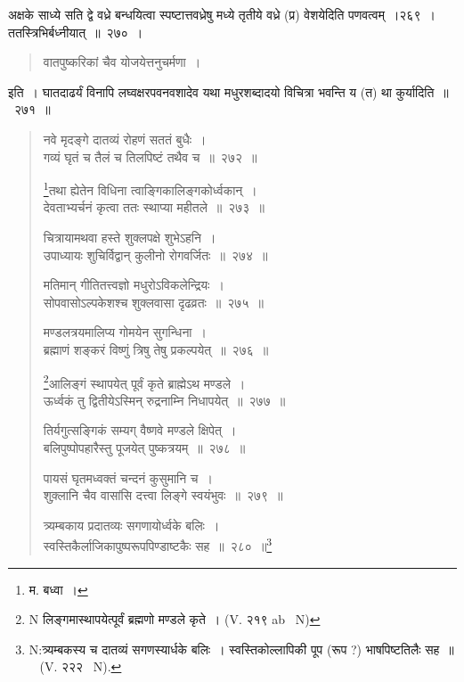 \documentclass[11pt, openany]{book}
\begin{document}
अक्षके साध्ये सति द्वे वध्रे बन्धयित्वा स्पष्टात्तवध्रेषु मध्ये तृतीये वध्रे (प्र) वेशयेदिति पणवत्वम्~।२६९~।\\

ततस्त्रिभिर्बध्नीयात्~॥~२७०~। 

\begin{quote}
{\qt वातपुष्करिकां चैव योजयेत्तनुचर्मणा~।}
\end{quote}

\noindent
इति~। घातदाढर्यं विनापि लघ्वक्षरपवनवशादेव यथा मधुरशब्दादयो विचित्रा भवन्ति य (त) था कुर्यादिति~॥~२७१~॥

\newpage

\begin{quote}
{\na  नवे मृदङ्गे दातव्यं रोहणं सततं बुधैः~।\\
 गव्यं घृतं च तैलं च तिलपिष्टं तथैव च~॥~२७२~॥

 \renewcommand{\thefootnote}{1}\footnote{म. बध्वा~।}तथा ह्येतेन विधिना त्वाङ्गिकालिङ्गकोर्ध्वकान्~।\\
 देवताभ्यर्चनं कृत्वा ततः स्थाप्या महीतले~॥~२७३~॥

 चित्रायामथवा हस्ते शुक्लपक्षे शुभेऽहनि~।\\
 उपाध्यायः शुचिर्विद्वान् कुलीनो रोगवर्जितः~॥~२७४~॥

 मतिमान् गीतितत्त्वज्ञो मधुरोऽविकलेन्द्रियः~।\\
 सोपवासोऽल्पकेशश्च शुक्लवासा दृढव्रतः~॥~२७५~॥

 मण्डलत्रयमालिप्य गोमयेन सुगन्धिना~।\\
 ब्रह्माणं शङ्करं विष्णुं त्रिषु तेषु प्रकल्पयेत्~॥~२७६~॥

 \renewcommand{\thefootnote}{2}\footnote{N लिङ्गमास्थापयेत्पूर्वं ब्रह्मणो मण्डले कृते~। (V. २१९ ab \textendash\ N)}आलिङ्गं स्थापयेत् पूर्वं कृते ब्राह्मेऽथ मण्डले~।\\
 ऊर्ध्वकं तु द्वितीयेऽस्मिन् रुद्रनाम्नि निधापयेत्~॥~२७७~॥

 तिर्यगुत्सङ्गिकं सम्यग् वैष्णवे मण्डले क्षिपेत्~।\\
 बलिपुष्पोपहारैस्तु पूजयेत् पुष्कत्रयम्~॥~२७८~॥

 पायसं घृतमध्वक्तं चन्दनं कुसुमानि च~।\\
 शुक़्लानि चैव वासांसि दत्त्वा लिङ्गे स्वयंभुवः~॥~२७९~॥

 त्र्यम्बकाय प्रदातव्यः सगणायोर्ध्वके बलिः~।\\
 स्वस्तिकैर्लाजिकापुष्परूपपिण्डाष्टकैः सह~॥~२८०~॥\renewcommand{\thefootnote}{3}\footnote{N:त्र्यम्बकस्य च दातव्यं  सगणस्यार्धके बलिः~। स्वस्तिकोल्लापिकी पूप (रूप ?) भाषपिष्टतिलैः सह~॥~ (V. २२२ \textendash\ N).}}
\end{quote}
 
\end{document}
